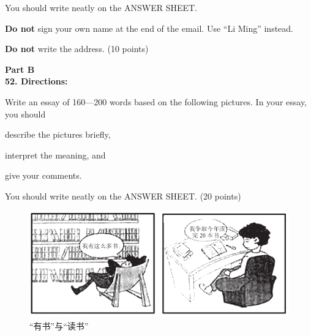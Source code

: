 You should write neatly on the ANSWER SHEET.

\textbf{Do not} sign your own name at the end of the email. Use ``Li
Ming'' instead.

\textbf{Do not} write the address. (10 points)

\vspace{2em}

\noindent
\textbf{Part B}\\
\textbf{52. Directions:}

Write an essay of 160---200 words based on the following pictures. In
your essay, you should
\begin{listwrite}
	\item
describe the pictures briefly,

\item 
 interpret the meaning, and

\item 
 give your comments.
\end{listwrite}

You should write neatly on the ANSWER SHEET. (20 points)


\begin{figure}[h!]
	\centering
	\includegraphics[width=0.87\linewidth]{picture/2017.png}
	\caption*{“有书”与“读书”}
\end{figure}



